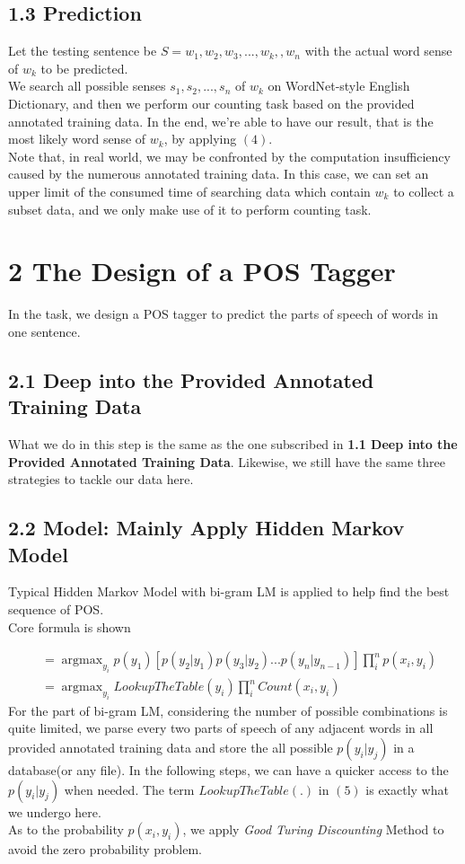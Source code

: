 \documentclass{article}
\begin{document}
\subsection*{1.3 Prediction}
Let the testing sentence be $S=w_1, w_2, w_3,...,w_k, , w_n$ with the actual word sense of $w_k$ to be predicted.\\[12px]
We search all possible senses $s_1, s_2,..., s_n$ of $w_k$ on WordNet-style English Dictionary, and then we perform our counting task based on the provided annotated training data. In the end, we're able to have our result, that is the most likely word sense of $w_k$, by applying $(4)$.\\[12px]
Note that, in real world, we may be confronted by the computation insufficiency caused by the numerous annotated training data. In this case, we can set an upper limit of the consumed time of searching data which contain $w_k$ to collect a subset data, and we only make use of it to perform counting task.



\section*{2 The Design of a POS Tagger}
In the task, we design a POS tagger to predict the parts of speech of words in one sentence.

\subsection*{2.1 Deep into the Provided Annotated Training Data}
What we do in this step is the same as the one subscribed in \textbf{1.1 Deep into the Provided Annotated Training Data}. Likewise, we still have the same three strategies to tackle our data here.

\subsection*{2.2 Model: Mainly Apply Hidden Markov Model}
Typical Hidden Markov Model with bi-gram LM is applied to help find the best sequence of POS.\\
Core formula is shown

\begin{align*}
[y*_i] &= \mathop{\arg\max}_{y_i} p(y_1) [p(y_2 | y_1) p(y_3 | y_2) ... p(y_n | y_{n-1})] \prod_{i}^n p(x_i, y_i) \\
&= \mathop{\arg\max}_{y_i} LookupTheTable(y_i) \prod_i^n Count(x_i, y_i) \tag{5}
\end{align*}
For the part of bi-gram LM, considering the number of possible combinations is quite limited, we parse every two parts of speech of any adjacent words in all provided annotated training data and store the all possible $p(y_i | y_j)$ in a database(or any file). In the following steps, we can have a quicker access to the $p(y_i | y_j)$ when needed. The term $LookupTheTable(.)$ in $(5)$ is exactly what we undergo here.\\[12px]
As to the probability $p(x_i, y_i)$, we apply \textit{Good Turing Discounting} Method to avoid the zero probability problem.
\end{document}
